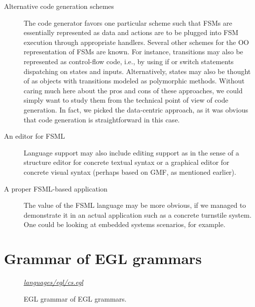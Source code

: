 \documentclass[preprint,authoryear,12pt]{noelsarticle}
\newcommand{\codefigure}[3]{
\begin{figure}[t!]
\begin{boxedminipage}{\hsize}
\mbox{}\hfill{}{\small\textit{\href{http://github.com/slebok/slepro/tree/master/#2}{#2}}}

\end{boxedminipage}
\caption{#1.}
\label{#2}
\medskip
\end{figure}}
\begin{document}
\begin{description}
\item[Alternative code generation schemes] The code generator favors
  one particular scheme such that FSMs are essentially represented as
  data and actions are to be plugged into FSM execution through
  appropriate handlers. Several other schemes for the OO
  representation of FSMs are known. For instance, transitions may also
  be represented as control-flow code, i.e., by using if or switch
  statements dispatching on states and inputs. Alternatively, states
  may also be thought of as objects with transitions modeled as
  polymorphic methods. Without caring much here about the pros and
  cons of these approaches, we could simply want to study them from
  the technical point of view of code generation.  In fact, we picked
  the data-centric approach, as it was obvious that code generation is
  straightforward in this case.

\item[An editor for FSML] Language support may also include editing
  support as in the sense of a structure editor for concrete textual
  syntax or a graphical editor for concrete visual syntax (perhaps
  based on GMF, as mentioned earlier).

\item[A proper FSML-based application] The value of the FSML language
  may be more obvious, if we managed to demonstrate it in an actual
  application such as a concrete turnstile system. One could be
  looking at embedded systems scenarios, for example.

\end{description}


{\small

%
%
%

}


\appendix


\pagebreak

\section{Grammar of EGL grammars}
\label{A:egl}

\codefigure{%
EGL grammar of EGL grammars}{%
languages/egl/cs.egl}{%
egl}
\end{document}

